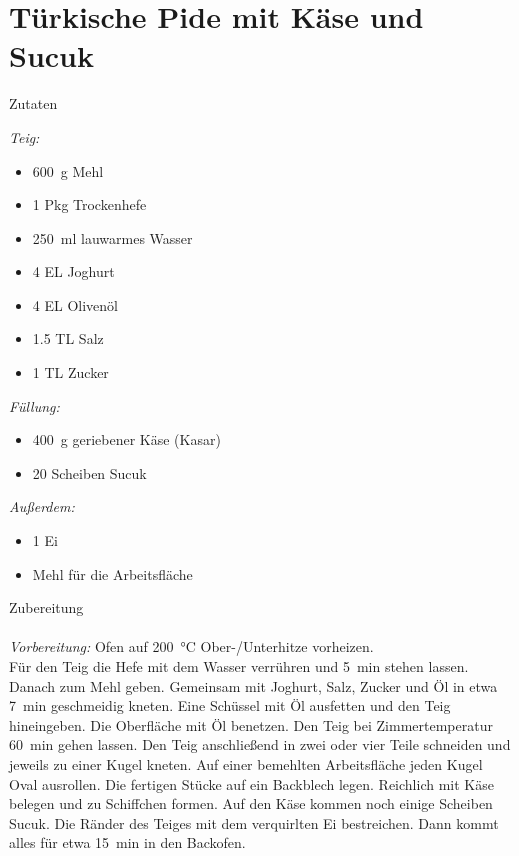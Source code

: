 \section*{Türkische Pide mit Käse und Sucuk}
\ihead{}\ohead{}
\cfoot{}
{\Large Zutaten}
\begin{multicols}{2}
\textit{Teig:}
\begin{itemize}
    \item \SI{600}{g} Mehl
    \item \num{1} Pkg Trockenhefe
    \item \SI{250}{ml} lauwarmes Wasser
    \item \num{4} EL Joghurt
    \item \num{4} EL Olivenöl
    \item \num{1.5} TL Salz
    \item \num{1} TL Zucker
\end{itemize}
\textit{Füllung:}
\begin{itemize}
    \item \SI{400}{g} geriebener Käse (Kasar)
    \item \num{20} Scheiben Sucuk
\end{itemize}
\textit{Außerdem:}
\begin{itemize}
    \item \num{1} Ei
    \item Mehl für die Arbeitsfläche
\end{itemize}
\end{multicols}
\noindent
{\Large Zubereitung}\\
\\
\textit{Vorbereitung:} Ofen auf \SI{200}{\celsius} Ober-/Unterhitze vorheizen.\\
Für den Teig die Hefe mit dem Wasser verrühren und \SI{5}{min} stehen lassen. 
Danach zum Mehl geben. 
Gemeinsam mit Joghurt, Salz, Zucker und Öl in etwa \SI{7}{min} geschmeidig kneten. 
Eine Schüssel mit Öl ausfetten und den Teig hineingeben. 
Die Oberfläche mit Öl benetzen. 
Den Teig bei Zimmertemperatur \SI{60}{min} gehen lassen. 
Den Teig anschließend in zwei oder vier Teile schneiden und jeweils zu einer Kugel kneten. 
Auf einer bemehlten Arbeitsfläche jeden Kugel Oval ausrollen.
Die fertigen Stücke auf ein Backblech legen. 
Reichlich mit Käse belegen und zu Schiffchen formen. 
Auf den Käse kommen noch einige Scheiben Sucuk. 
Die Ränder des Teiges mit dem verquirlten Ei bestreichen. 
Dann kommt alles für etwa \SI{15}{min} in den Backofen. 
